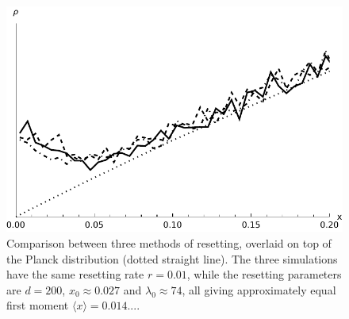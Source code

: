 \documentclass[a4paper,12pt,reqno,superscriptaddress,nofootinbib]{revtex4}
\theoremstyle{plain}
\theoremstyle{definition}
\theoremstyle{remark}
\newcommand{\0}{^{(0)}}
\newcommand{\1}{^{(1)}}
\newcommand{\2}{^{(2)}}
\begin{document}
\begin{figure}[th]
	\includegraphics[width=\textwidth]{spd_compare.pdf}
	\caption{Comparison between three methods of resetting, overlaid on top of the Planck distribution (dotted straight line).  The three simulations have the same resetting rate  $r=0.01$, while the resetting parameters are $d=200$, $x_0\approx0.027$ and $\lambda_0\approx74$, all giving approximately equal first moment  $\langle x \rangle = 0.014...$. }\label{fig:compare}
\end{figure}
\end{document}
